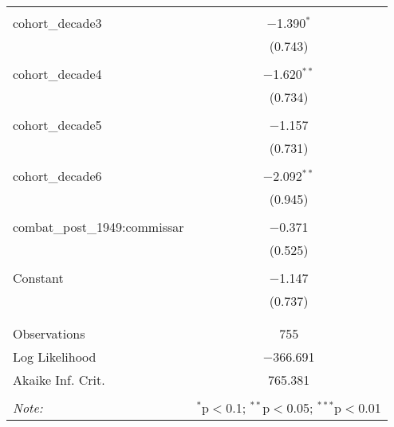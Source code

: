 \documentclass[12pt,letterpaper]{article}
\begin{document}
\begin{table}[!htbp]
{\begin{tabular}{@{\extracolsep{5pt}}lc}
		& \\ 
		cohort\_decade3 & $-$1.390$^{*}$ \\ 
		& (0.743) \\ 
		& \\ 
		cohort\_decade4 & $-$1.620$^{**}$ \\ 
		& (0.734) \\ 
		& \\ 
		cohort\_decade5 & $-$1.157 \\ 
		& (0.731) \\ 
		& \\ 
		cohort\_decade6 & $-$2.092$^{**}$ \\ 
		& (0.945) \\ 
		& \\ 
		combat\_post\_1949:commissar & $-$0.371 \\ 
		& (0.525) \\ 
		& \\ 
		Constant & $-$1.147 \\ 
		& (0.737) \\ 
		& \\ 
		\hline \\[-1.8ex] 
		Observations & 755 \\ 
		Log Likelihood & $-$366.691 \\ 
		Akaike Inf. Crit. & 765.381 \\ 
		\hline 
		\hline \\[-1.8ex] 
		\textit{Note:}  & \multicolumn{1}{r}{$^{*}$p$<$0.1; $^{**}$p$<$0.05; $^{***}$p$<$0.01} \\ 
	\end{tabular} }
\end{table} 
\end{document}
